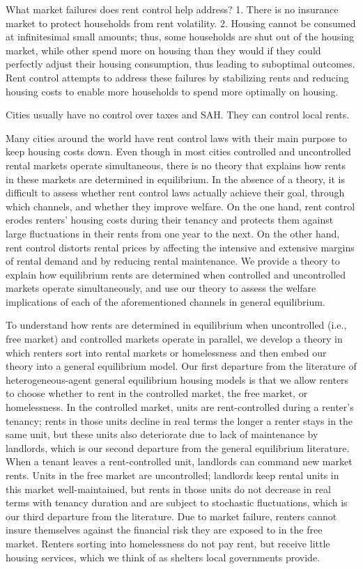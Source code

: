 \documentclass[parskip=full]{article}
\begin{document}
What market failures does rent control help address? 1. There is no insurance market to protect households from rent volatility. 2. Housing cannot be consumed at infinitesimal small amounts; thus, some households are shut out of the housing market, while other spend more on housing than they would if they could perfectly adjust their housing consumption, thus leading to suboptimal outcomes. Rent control attempts to address these failures by stabilizing rents and reducing housing costs to enable more households to spend more optimally on housing.  

Cities usually have no control over taxes and SAH. They can control local rents.

Many cities around the world have rent control laws with their main purpose to keep housing costs down. Even though in most cities controlled and uncontrolled rental markets operate simultaneous, there is no theory that explains how rents in these markets are determined in equilibrium. In the absence of a theory, it is difficult to assess whether rent control laws actually achieve their goal, through which channels, and whether they improve welfare. On the one hand, rent control erodes renters' housing costs during their tenancy and protects them against large fluctuations in their rents from one year to the next. On the other hand, rent control distorts rental prices by affecting the intensive and extensive margins of rental demand and by reducing rental maintenance. We provide a theory to explain how equilibrium rents are determined when controlled and uncontrolled markets operate simultaneously, and use our theory to assess the welfare implications of each of the aforementioned channels in general equilibrium.

To understand how rents are determined in equilibrium when uncontrolled (i.e., free market) and controlled markets operate in parallel, we develop a theory in which renters sort into rental markets or homelessness and then embed our theory into a general equilibrium model. Our first departure from the literature of heterogeneous-agent general equilibrium housing models is that we allow renters to choose whether to rent in the controlled market, the free market, or homelessness. In the controlled market, units are rent-controlled during a renter's tenancy; rents in those units decline in real terms the longer a renter stays in the same unit, but these units also deteriorate due to lack of maintenance by landlords, which is our second departure from the general equilibrium literature. When a tenant leaves a rent-controlled unit, landlords can command new market rents. Units in the free market are uncontrolled; landlords keep rental units in this market well-maintained, but rents in those units do not decrease in real terms with tenancy duration and are subject to stochastic fluctuations, which is our third departure from the literature. Due to market failure, renters cannot insure themselves against the financial risk they are exposed to in the free market. Renters sorting into homelessness do not pay rent, but receive little housing services, which we think of as shelters local governments provide. 
\end{document}
